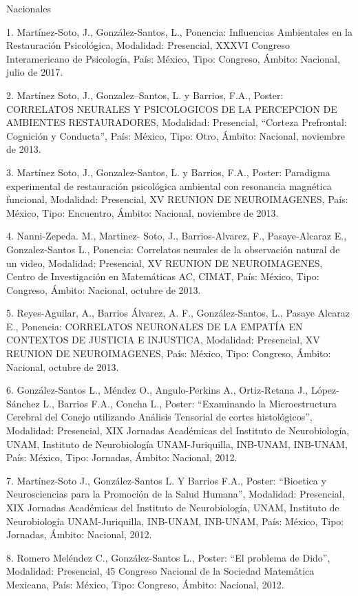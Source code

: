 \documentclass[12pt]{article}
\begin{document}
Nacionales

1. Martínez-Soto, J., González-Santos, L., Ponencia: Influencias Ambientales en la Restauración Psicológica, Modalidad: Presencial, 
XXXVI Congreso Interamericano de Psicología, País: México, Tipo: Congreso, Ámbito: Nacional, julio de 2017.

2. Martínez Soto, J., Gonzalez--Santos, L. y Barrios, F.A., Poster: CORRELATOS NEURALES Y PSICOLOGICOS DE LA PERCEPCION 
DE AMBIENTES RESTAURADORES, Modalidad: Presencial, “Corteza Prefrontal: Cognición y Conducta”, País: México, Tipo: Otro, Ámbito: 
Nacional, noviembre de 2013.

3. Martínez Soto, J., Gonzalez-Santos, L. y Barrios, F.A., Poster: Paradigma experimental de restauración psicológica ambiental con 
resonancia magnética funcional, Modalidad: Presencial, XV REUNION DE NEUROIMAGENES, País: México, Tipo: Encuentro, Ámbito: Nacional, 
noviembre de 2013.

4. Nanni-Zepeda. M., Martinez- Soto, J., Barrios-Alvarez, F., Pasaye-Alcaraz E., Gonzalez-Santos L., Ponencia: Correlatos neurales de 
la observación natural de un video, Modalidad: Presencial, XV REUNION DE NEUROIMAGENES, Centro de Investigación en Matemáticas AC, 
CIMAT, País: México, Tipo: Congreso, Ámbito: Nacional, octubre de 2013.

5. Reyes-Aguilar, A., Barrios Álvarez, A. F., González-Santos, L., Pasaye Alcaraz E., Ponencia: CORRELATOS NEURONALES DE LA EMPATÍA EN 
CONTEXTOS DE JUSTICIA E INJUSTICA, Modalidad: Presencial, XV REUNION DE NEUROIMAGENES, País: México, Tipo: Congreso, Ámbito: Nacional, 
octubre de 2013.

6. González-Santos L., Méndez O., Angulo-Perkins A., Ortiz-Retana J., López-Sánchez L., Barrios F.A., Concha L., Poster: “Examinando la 
Microestructura Cerebral del Conejo utilizando Análisis Tensorial de cortes histológicos”, Modalidad: Presencial, XIX Jornadas 
Académicas del Instituto de Neurobiología, UNAM, Instituto de Neurobiología UNAM-Juriquilla, INB-UNAM, INB-UNAM, País: México, Tipo: 
Jornadas, Ámbito: Nacional, 2012.

7. Martínez-Soto J., González-Santos L. Y Barrios F.A., Poster: “Bioetica y Neurosciencias para la Promoción de la Salud Humana”, 
Modalidad: Presencial, XIX Jornadas Académicas del Instituto de Neurobiología, UNAM, Instituto de Neurobiología UNAM-Juriquilla, 
INB-UNAM, INB-UNAM, País: México, Tipo: Jornadas, Ámbito: Nacional, 2012.

8. Romero Meléndez C., González-Santos L., Poster: “El problema de Dido”, Modalidad: Presencial, 45 Congreso Nacional de la Sociedad 
Matemática Mexicana, País: México, Tipo: Congreso, Ámbito: Nacional, 2012.
\end{document}
